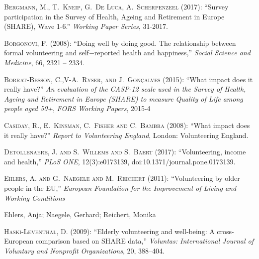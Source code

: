 \documentclass[10pt, letterpaper]{article}
\begin{document}
\begin{spacing}{1.4}
\begin{thebibliography}{87}
\textsc{Bergmann, M., T.~Kneip, G.~De Luca, A.~Scherpenzeel} (2017):  \enquote{Survey participation in the Survey of Health, Ageing and Retirement in Europe (SHARE), Wave 1-6.} \emph{Working Paper Series}, 31-2017.


\textsc{Borgonovi, F.} (2008): \enquote{Doing well by doing good. The relationship between formal volunteering and self$-$reported health and happiness,} \emph{Social Science and Medicine}, 66,  2321 -- 2334.

\textsc{Borrat-Besson, C.,V-A.~Ryser, and J.~Gonçalves} (2015):  \enquote{What impact does it really have?} \emph{An evaluation of the CASP-12 scale used in the Survey of Health, Ageing and Retirement in Europe (SHARE) to measure Quality of Life among people aged 50+}, \emph{FORS Working Papers}, 2015-4


\textsc{Casiday, R., E.~Kinsman, C.~Fisher and C.~Bambra} (2008):  \enquote{What impact does it really have?} \emph{Report to Volunteering England}, London: Volunteering England.

\textsc{Detollenaere, J. and S.~Willems and S.~Baert} (2017): \enquote{Volunteering, income and health,} \emph{PLoS ONE}, 12(3):e0173139,  doi:10.1371/journal.pone.0173139.

\textsc{Ehlers, A. and G.~Naegele and M.~Reichert} (2011): \enquote{Volunteering by older people in the EU,} \emph{European Foundation for the Improvement of Living and Working Conditions} 

Ehlers, Anja; Naegele, Gerhard; Reichert, Monika

\textsc{Haski-Leventhal, D.} (2009): \enquote{Elderly volunteering and
  well-being: A cross-European comparison based on SHARE data,} \emph{Voluntas:
  International Journal of Voluntary and Nonprofit Organizations}, 20, 388--404.
  

\end{thebibliography}
\end{spacing}
\end{document}
